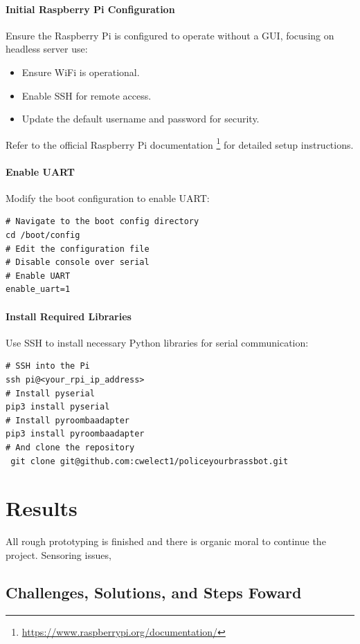 \documentclass{scrarticle}
\begin{document}
\paragraph{Initial Raspberry Pi Configuration}
Ensure the Raspberry Pi is configured to operate without a GUI, focusing on headless server use:
\begin{itemize}
    \item Ensure WiFi is operational.
    \item Enable SSH for remote access.
    \item Update the default username and password for security.
\end{itemize}
Refer to the official Raspberry Pi documentation \footnote{\url{https://www.raspberrypi.org/documentation/}} for detailed setup instructions.

\paragraph{Enable UART}
Modify the boot configuration to enable UART:
\begin{verbatim}
# Navigate to the boot config directory
cd /boot/config
# Edit the configuration file
# Disable console over serial
# Enable UART
enable_uart=1
\end{verbatim}

\paragraph{Install Required Libraries}
Use SSH to install necessary Python libraries for serial communication:
\begin{verbatim}
# SSH into the Pi
ssh pi@<your_rpi_ip_address>
# Install pyserial
pip3 install pyserial
# Install pyroombaadapter
pip3 install pyroombaadapter
# And clone the repository 
 git clone git@github.com:cwelect1/policeyourbrassbot.git
\end{verbatim}

\section{Results}
All rough prototyping is finished and there is organic moral to continue the project. Sensoring issues,  
\subsection{Challenges, Solutions, and Steps Foward}
\end{document}
